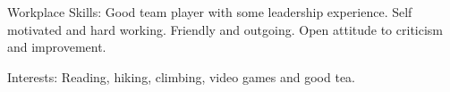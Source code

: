 
\inlineheadsection 
{Workplace Skills:} {Good team player with some leadership experience. Self motivated and hard working. Friendly and outgoing. Open attitude to criticism and improvement.}

\inlineheadsection 
{Interests:} {Reading, hiking, climbing, video games and good tea.}
